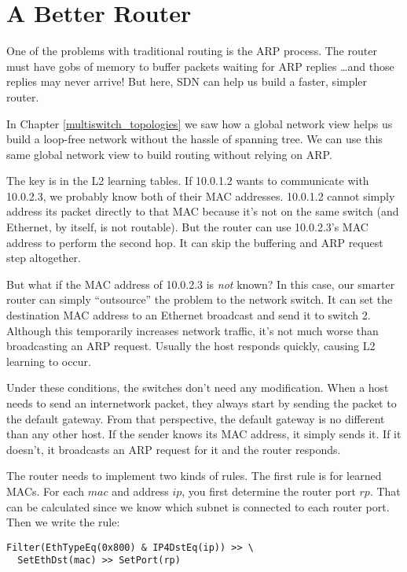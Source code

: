 \section{A Better Router}

One of the problems with traditional routing is the ARP process.  The router must have gobs of memory 
to buffer packets waiting for ARP replies \ldots and those replies may never arrive!  But here, SDN 
can help us build a faster, simpler router.

In Chapter \ref{multiswitch_topologies} we saw how a global network view helps us build a loop-free
network without the hassle of spanning tree.  We can use this same global network view to build
routing without relying on ARP.  

The key is in the L2 learning tables.  If 10.0.1.2 wants to communicate with 10.0.2.3, we probably know
both of their MAC addresses.  10.0.1.2 cannot simply address its packet directly to that MAC because
it's not on the same switch (and Ethernet, by itself, is not routable).  But the router can use 
10.0.2.3's MAC address to perform the second hop.  It can skip the buffering and ARP request step
altogether.

But what if the MAC address of 10.0.2.3 is \emph{not} known?  In this case, our smarter router can simply
``outsource'' the problem to the network switch.  It can set the destination MAC address to an 
Ethernet broadcast and send it to switch 2.  Although this temporarily increases network traffic, it's not much
worse than broadcasting an ARP request.  Usually the host responds quickly, causing L2 learning to 
occur.  

Under these conditions, the switches don't need any modification.  When a host needs to send an 
internetwork packet, they always start by sending the packet to the default gateway.  From that 
perspective, the default gateway is no different than any other host.  If the sender knows 
its MAC address, it simply sends it.  If it doesn't, it broadcasts an ARP request for it and the
router responds.  

The router needs to implement two kinds of rules.  The first rule is for learned MACs.  For each
$mac$ and address $ip$, you first determine the router port $rp$.  That can be calculated since
we know which subnet is connected to each router port.  Then we write the rule:

\begin{verbatim}
Filter(EthTypeEq(0x800) & IP4DstEq(ip)) >> \
  SetEthDst(mac) >> SetPort(rp) 
\end{verbatim}

